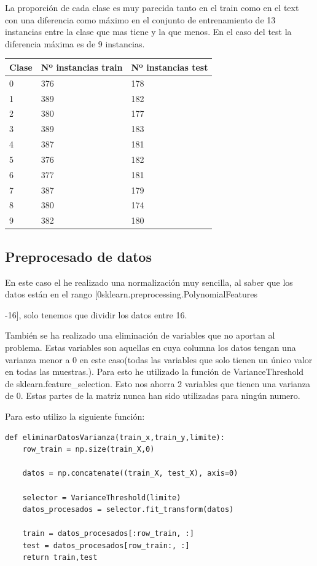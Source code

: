\documentclass[titlepage]{article}
\begin{document}
	La proporción de cada clase es muy parecida tanto en el train como en el text con una diferencia como máximo en el conjunto de entrenamiento de 13 instancias entre la clase que mas tiene y la que menos. En el caso del test la diferencia máxima es de 9 instancias. 
	
		\begin{table}[htbp]
		\begin{center}
			\begin{tabular}{|l|l|l|}
				\hline
				Clase & Nº instancias train & Nº instancias test\\
				\hline
				0 & 376 & 178\\ 
				\hline
				1 & 389 & 182\\ 
				\hline
				2 & 380 & 177\\ 
				\hline
				3 & 389 & 183\\ 
				\hline
				4 & 387 & 181\\ 
				\hline
				5 & 376 & 182\\ 
				\hline
				6 & 377 & 181\\ 
				\hline
				7 & 387 & 179\\ 
				\hline
				8 & 380 & 174\\ 
				\hline
				9 & 382 & 180\\ 
				\hline
			\end{tabular}
		\end{center}
	\end{table}
	\newpage
	
	\subsection{Preprocesado de datos}
	En este caso el he realizado una normalización muy sencilla, al saber que los datos están en el rango [0sklearn.preprocessing.PolynomialFeatures
	
	-16], solo tenemos que dividir los datos entre 16.
	
	También se ha realizado una eliminación de variables que no aportan al problema. Estas variables son aquellas en cuya columna los datos tengan una varianza menor a 0 en este caso(todas las variables que solo tienen un único valor en todas las muestras.). Para esto he utilizado la función de VarianceThreshold de sklearn.feature\_selection.
	Esto nos ahorra 2 variables que tienen una varianza de 0. Estas partes de la matriz nunca han sido utilizadas para ningún numero.
	
	Para esto utilizo la siguiente función:
	\begin{lstlisting}
def eliminarDatosVarianza(train_x,train_y,limite):
	row_train = np.size(train_X,0)
	
	datos = np.concatenate((train_X, test_X), axis=0)
	
	selector = VarianceThreshold(limite)
	datos_procesados = selector.fit_transform(datos)
	
	train = datos_procesados[:row_train, :]
	test = datos_procesados[row_train:, :]
	return train,test
	\end{lstlisting}
	
\end{document}
